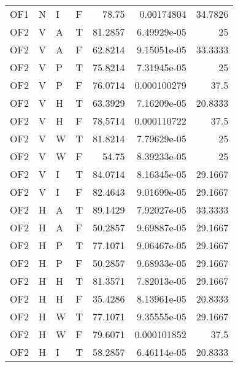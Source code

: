 \begin{longtable}{llllrrr}
    OF1      & N         & I         & F          & 78.75      & 0.00174804  & 34.7826  \\
    OF2      & V         & A         & T          & 81.2857    & 6.49929e-05 & 25       \\
    OF2      & V         & A         & F          & 62.8214    & 9.15051e-05 & 33.3333  \\
    OF2      & V         & P         & T          & 75.8214    & 7.31945e-05 & 25       \\
    OF2      & V         & P         & F          & 76.0714    & 0.000100279 & 37.5     \\
    OF2      & V         & H         & T          & 63.3929    & 7.16209e-05 & 20.8333  \\
    OF2      & V         & H         & F          & 78.5714    & 0.000110722 & 37.5     \\
    OF2      & V         & W         & T          & 81.8214    & 7.79629e-05 & 25       \\
    OF2      & V         & W         & F          & 54.75      & 8.39233e-05 & 25       \\
    OF2      & V         & I         & T          & 84.0714    & 8.16345e-05 & 29.1667  \\
    OF2      & V         & I         & F          & 82.4643    & 9.01699e-05 & 29.1667  \\
    OF2      & H         & A         & T          & 89.1429    & 7.92027e-05 & 33.3333  \\
    OF2      & H         & A         & F          & 50.2857    & 9.69887e-05 & 29.1667  \\
    OF2      & H         & P         & T          & 77.1071    & 9.06467e-05 & 29.1667  \\
    OF2      & H         & P         & F          & 50.2857    & 9.68933e-05 & 29.1667  \\
    OF2      & H         & H         & T          & 81.3571    & 7.82013e-05 & 29.1667  \\
    OF2      & H         & H         & F          & 35.4286    & 8.13961e-05 & 20.8333  \\
    OF2      & H         & W         & T          & 77.1071    & 9.35555e-05 & 29.1667  \\
    OF2      & H         & W         & F          & 79.6071    & 0.000101852 & 37.5     \\
    OF2      & H         & I         & T          & 58.2857    & 6.46114e-05 & 20.8333  \\

\end{longtable}

